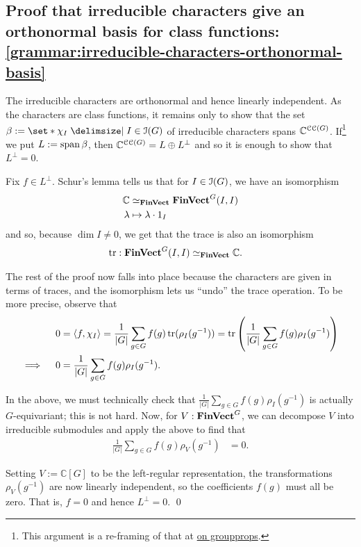\subsection{Proof that irreducible characters give an orthonormal basis for class functions: \ref{grammar:irreducible-characters-orthonormal-basis}} %
\pan The irreducible characters are orthonormal and hence linearly independent. As the characters are class functions, it remains only to show that the set $\beta := \set*{ \chi_I \given I \in \Irred(G) }$ of irreducible characters spans $\mathbb{C}^{\operatorname{\mathcal{CC}}(G)}$. If\footnote{This argument is a re-framing of that at \href{https://groupprops.subwiki.org/wiki/Splitting_implies_characters_form_a_basis_for_space_of_class_functions}{on groupprops}.} we put $L := \operatorname{span} \beta$, then $\mathbb{C}^{\operatorname{\mathcal{CC}}(G)} = L \oplus L^{\perp}$ and so it is enough to show that $L^{\perp} = 0$.
\par Fix $f \in L^{\perp}$. Schur's lemma tells us that for $I \in \operatorname{\mathcal{I}}(G)$, we have an isomorphism
\begin{align*}
  \mathbb{C} & \simeq_{\operatorname{\mathbf{FinVect}}} \operatorname{\mathbf{FinVect}}^G (I, I) \\
  \lambda & \mapsto \lambda \cdot 1_I
\end{align*}
and so, because $\dim I \neq 0$, we get that the trace is also an isomorphism
\begin{align*}
  \operatorname{tr} : \operatorname{\mathbf{FinVect}}^G (I, I) & \simeq_{\operatorname{\mathbf{FinVect}}} \mathbb{C}
  .
\end{align*}
\par The rest of the proof now falls into place because the characters are given in terms of traces, and the isomorphism lets us ``undo'' the trace operation. To be more precise, observe that
\begin{align*}
  0
  &= \langle f, \chi_I \rangle
  = \frac{1}{\lvert G \rvert} \sum_{g \in G}
    f(g) \operatorname{tr} (\rho_I (g^{-1}))
  = \operatorname{tr}\left(
    \frac{1}{\lvert G \rvert} \sum_{g \in G}
      f(g) \rho_I (g^{-1})
  \right)
  \\
  \implies\quad
  0
  &= \frac{1}{\lvert G \rvert} \sum_{g \in G}
    f(g) \rho_I (g^{-1})
  .
\end{align*}
\par In the above, we must technically check that $
  \frac{1}{\lvert G \rvert} \sum_{g \in G}
    f(g) \rho_I (g^{-1})
$ is actually $G$-equivariant; this is not hard. Now, for $V : \operatorname{\mathbf{FinVect}}^G$, we can decompose $V$ into irreducible submodules and apply the above to find that
\begin{align*}
  \frac{1}{\lvert G \rvert} \sum_{g \in G}
    f(g) \rho_V (g^{-1})
  &= 0
  .
\end{align*}
\par Setting $V := \mathbb{C}[G]$ to be the left-regular representation, the transformations $\rho_V (g^{-1})$ are now linearly independent, so the coefficients $f(g)$ must all be zero. That is, $f = 0$ and hence $L^{\perp} = 0$. \qed

